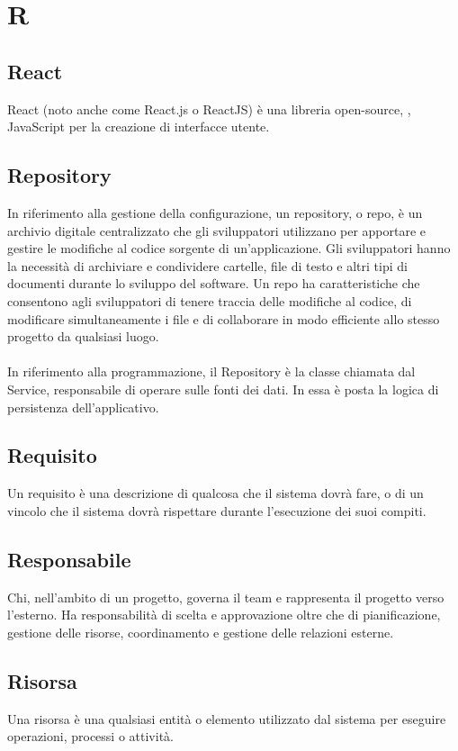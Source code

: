 \chapter{R}

\section{React}
React (noto anche come React.js o ReactJS) è una libreria open-source, , JavaScript per la creazione di interfacce utente.

\section{Repository}\label{sec:Repo}
In riferimento alla gestione della configurazione, un repository, o repo, è un archivio digitale centralizzato che gli sviluppatori utilizzano per apportare e gestire le modifiche al codice sorgente di un'applicazione. Gli sviluppatori hanno la necessità di archiviare e condividere cartelle, file di testo e altri tipi di documenti durante lo sviluppo del software. Un repo ha caratteristiche che consentono agli sviluppatori di tenere traccia delle modifiche al codice, di modificare simultaneamente i file e di collaborare in modo efficiente allo stesso progetto da qualsiasi luogo.\\ \\
In riferimento alla programmazione, il Repository è la classe chiamata dal Service, responsabile di operare sulle fonti dei dati. In essa è posta la logica di persistenza dell'applicativo.

\section{Requisito}\label{sec:Requisiti}
Un requisito è una descrizione di qualcosa che il sistema dovrà fare, o di un vincolo che il sistema dovrà rispettare durante l’esecuzione dei suoi compiti.

\section{Responsabile}
Chi, nell'ambito di un progetto, governa il team e rappresenta il progetto verso l'esterno. Ha responsabilità di scelta e approvazione oltre che di pianificazione, gestione delle risorse, coordinamento e gestione delle relazioni esterne. 

\section{Risorsa}\label{sec:Risorse}
Una risorsa è una qualsiasi entità o elemento utilizzato dal sistema per eseguire operazioni, processi o attività.

